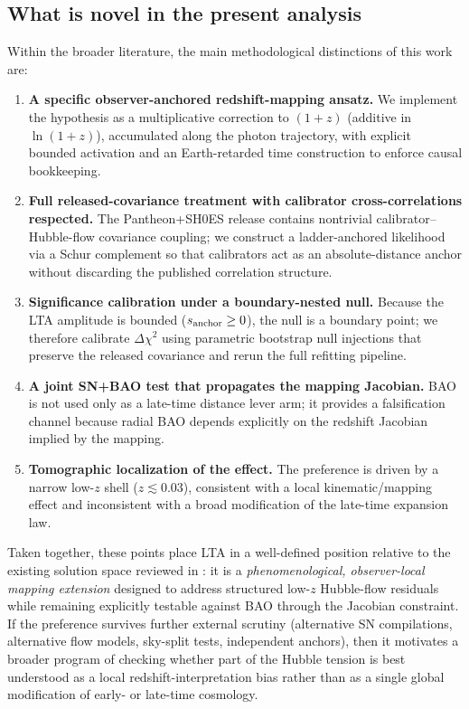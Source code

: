 \documentclass[10pt]{article}
\begin{document}
\subsection{What is novel in the present analysis}
Within the broader literature, the main methodological distinctions of this work are:

\begin{enumerate}[leftmargin=1.2em]
\item \textbf{A specific observer-anchored redshift-mapping ansatz.}
We implement the hypothesis as a multiplicative correction to $(1+z)$ (additive in $\ln(1+z)$),
accumulated along the photon trajectory, with explicit bounded activation and an Earth-retarded
time construction to enforce causal bookkeeping.

\item \textbf{Full released-covariance treatment with calibrator cross-correlations respected.}
The Pantheon+SH0ES release contains nontrivial calibrator--Hubble-flow covariance coupling; we
construct a ladder-anchored likelihood via a Schur complement so that calibrators act as an
absolute-distance anchor without discarding the published correlation structure.

\item \textbf{Significance calibration under a boundary-nested null.}
Because the LTA amplitude is bounded ($s_{\rm anchor}\ge 0$), the null is a boundary point; we
therefore calibrate $\Delta\chi^2$ using parametric bootstrap null injections that preserve the
released covariance and rerun the full refitting pipeline.

\item \textbf{A joint SN+BAO test that propagates the mapping Jacobian.}
BAO is not used only as a late-time distance lever arm; it provides a falsification channel because
radial BAO depends explicitly on the redshift Jacobian implied by the mapping.

\item \textbf{Tomographic localization of the effect.}
The preference is driven by a narrow low-$z$ shell ($z\lesssim 0.03$), consistent with a local
kinematic/mapping effect and inconsistent with a broad modification of the late-time expansion law.
\end{enumerate}

Taken together, these points place LTA in a well-defined position relative to the existing solution
space reviewed in \cite{DiValentino2021Review}: it is a \emph{phenomenological, observer-local mapping
extension} designed to address structured low-$z$ Hubble-flow residuals while remaining explicitly
testable against BAO through the Jacobian constraint.
If the preference survives further external scrutiny (alternative SN compilations, alternative flow
models, sky-split tests, independent anchors), then it motivates a broader program of checking
whether part of the Hubble tension is best understood as a local redshift-interpretation bias rather
than as a single global modification of early- or late-time cosmology.
\end{document}

